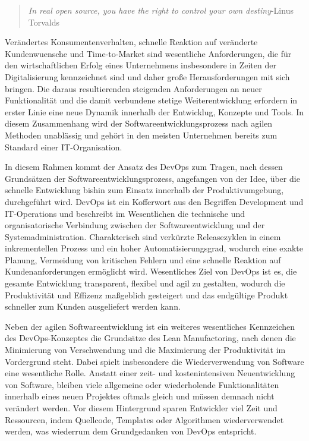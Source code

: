 \begin{quote}
\textit{In real open source, you have the right to control your own destiny}\newline -Linus Torvalds
\end{quote}

Verändertes Konsumentenverhalten, schnelle Reaktion auf veränderte Kundenwuensche und Time-to-Market sind wesentliche Anforderungen, die für den wirtschaftlichen Erfolg eines Unternehmens insbesondere in Zeiten der Digitalisierung kennzeichnet sind und daher große Herausforderungen mit sich bringen. Die daraus resultierenden steigenden Anforderungen an neuer Funktionalität und die damit verbundene stetige Weiterentwicklung erfordern in erster Linie eine neue Dynamik innerhalb der Entwicklug, Konzepte und Tools. In diesem Zusammenhang wird der Softwareentwicklungsprozess nach agilen Methoden unablässig und gehört in den meisten Unternehmen bereits zum Standard einer IT-Organisation. 

In diesem Rahmen kommt der Ansatz des DevOps zum Tragen, nach dessen Grundsätzen der Softwareentwicklungsprozess, angefangen von der Idee, über die schnelle Entwicklung bishin zum Einsatz innerhalb der Produktivumgebung, durchgeführt wird. DevOps ist ein Kofferwort aus den Begriffen Development und IT-Operations und beschreibt im Wesentlichen die technische und organisatorische Verbindung zwischen der Softwareentwicklung und der Systemadministration. Charakterisch sind verkürzte Releasezyklen in einem inkrementellen Prozess und ein hoher Automatisierungsgrad, wodurch eine exakte Planung, Vermeidung von kritischen Fehlern und eine schnelle Reaktion auf Kundenanforderungen ermöglicht wird. Wesentliches Ziel von DevOps ist es, die gesamte Entwicklung transparent, flexibel und agil zu gestalten, wodurch die Produktivität und Effizenz maßgeblich gesteigert und das endgültige Produkt schneller zum Kunden ausgeliefert werden kann. 

Neben der agilen Softwareentwicklung ist ein weiteres wesentliches Kennzeichen des DevOps-Konzeptes die Grundsätze des Lean Manufactoring, nach denen die Minimierung von Verschwendung und die Maximierung der Produktivität im Vordergrund steht. Dabei spielt insbesondere die Wiederverwendung von Software eine wesentliche Rolle. Anstatt einer zeit- und kostenintensiven Neuentwicklung von Software, bleiben viele allgemeine oder wiederholende Funktionalitäten innerhalb eines neuen Projektes oftmals gleich und müssen demnach nicht verändert werden. Vor diesem Hintergrund sparen Entwickler viel Zeit und Ressourcen, indem Quellcode, Templates oder Algorithmen wiederverwendet werden, was wiederrum dem Grundgedanken von DevOps entspricht. 

